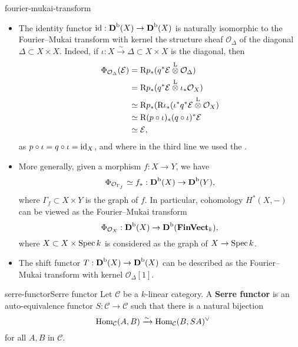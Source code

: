 \begin{example}{fourier-mukai-transform}
    \begin{itemize}
        \item The identity functor $\text{id} : \textbf{D}^\textup{b}(X) \to \textbf{D}^\textup{b}(X)$ is naturally isomorphic to the Fourier--Mukai transform with kernel the structure sheaf $\mathcal{O}_\Delta$ of the diagonal $\Delta \subset X \times X$. Indeed, if $\iota : X \xrightarrow{\sim} \Delta \subset X \times X$ is the diagonal, then
        \[ \begin{aligned}
            \Phi_{\mathcal{O}_\Delta}(\mathcal{E})
                &= \textup{R} p_* (q^* \mathcal{E} \overset{\textup{L}}{\otimes} \mathcal{O}_\Delta) \\
                &= \textup{R} p_* (q^* \mathcal{E} \overset{\textup{L}}{\otimes} \iota_* \mathcal{O}_X) \\
                &\simeq \textup{R} p_* (\textup{R} \iota_* (\iota^* q^* \mathcal{E} \overset{\textup{L}}{\otimes} \mathcal{O}_X) \\
                &\simeq \textup{R} (p \circ \iota)_* (q \circ \iota)^* \mathcal{E} \\
                &\simeq \mathcal{E} ,
        \end{aligned} \]
        as $p \circ \iota = q \circ \iota = \text{id}_X$, and where in the third line we used the .
        
        \item More generally, given a morphism $f : X \to Y$, we have
        \[ \Phi_{\mathcal{O}_{\Gamma_f}} \simeq f_* : \textbf{D}^\textup{b}(X) \to \textbf{D}^\textup{b}(Y) , \]
        where $\Gamma_f \subset X \times Y$ is the graph of $f$. In particular, cohomology $H^*(X, -)$ can be viewed as the Fourier--Mukai transform
        \[ \Phi_{\mathcal{O}_X} : \textbf{D}^\textup{b}(X) \to \textbf{D}^\textup{b}(\textbf{FinVect}_k) , \]
        where $X \subset X \times \operatorname{Spec} k$ is considered as the graph of $X \to \operatorname{Spec} k$.
        
        \item The shift functor $T : \textbf{D}^\textup{b}(X) \to \textbf{D}^\textup{b}(X)$ can be described as the Fourier--Mukai transform with kernel $\mathcal{O}_{\Delta}[1]$.
    \end{itemize}
\end{example}

\begin{topic}{serre-functor}{Serre functor}
    Let $\mathcal{C}$ be a $k$-linear category. A \textbf{Serre functor} is an auto-equivalence functor $S : \mathcal{C} \to \mathcal{C}$ such that there is a natural bijection
    \[ \text{Hom}_\mathcal{C}(A, B) \xrightarrow{\sim} \text{Hom}_\mathcal{C}(B, SA)^\vee \]
    for all $A, B$ in $\mathcal{C}$.
\end{topic}

